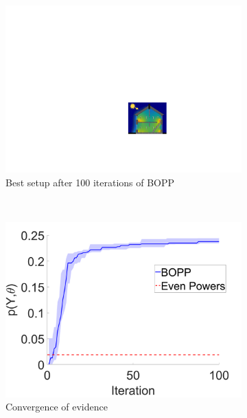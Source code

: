 \begin{figure}[t]
\begin{subfigure}[t]{0.47\textwidth}
				\includegraphics[width=\textwidth]{house-heating/100_iters.pdf}
				\caption{Best setup after 100 iterations of BOPP}
			\end{subfigure}
		~~~~ %
			\begin{subfigure}[t]{0.47\textwidth}
				\includegraphics[width=\textwidth]{house-heating/heating_rerun.pdf}
				\caption{Convergence of evidence}
			\end{subfigure}
	\caption{
		\label{fig:houses}
}
\end{figure}
